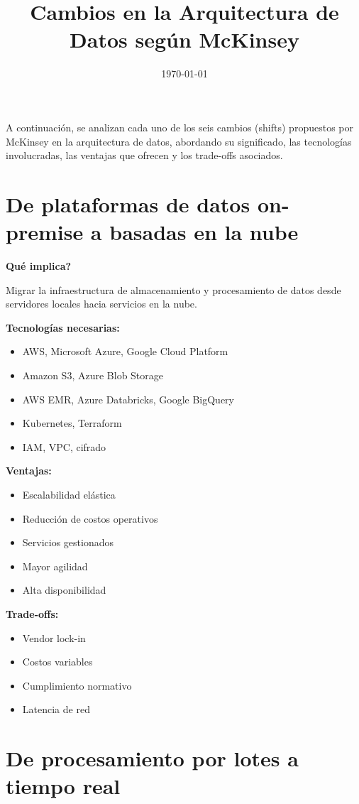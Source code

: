 \documentclass[12pt]{article}
\title{Cambios en la Arquitectura de Datos seg\'un McKinsey}
\date{\today}
\begin{document}
\maketitle

A continuaci\'on, se analizan cada uno de los seis cambios (shifts) propuestos por McKinsey en la arquitectura de datos, abordando su significado, las tecnolog\'ias involucradas, las ventajas que ofrecen y los trade-offs asociados.

\section{De plataformas de datos on-premise a basadas en la nube}

\textbf{\textquestiondown Qu\'e implica?} \par
Migrar la infraestructura de almacenamiento y procesamiento de datos desde servidores locales hacia servicios en la nube.

\textbf{Tecnolog\'ias necesarias:}
\begin{itemize}
\item AWS, Microsoft Azure, Google Cloud Platform
\item Amazon S3, Azure Blob Storage
\item AWS EMR, Azure Databricks, Google BigQuery
\item Kubernetes, Terraform
\item IAM, VPC, cifrado
\end{itemize}

\textbf{Ventajas:}
\begin{itemize}
\item Escalabilidad el\'astica
\item Reducci\'on de costos operativos
\item Servicios gestionados
\item Mayor agilidad
\item Alta disponibilidad
\end{itemize}

\textbf{Trade-offs:}
\begin{itemize}
\item Vendor lock-in
\item Costos variables
\item Cumplimiento normativo
\item Latencia de red
\end{itemize}

\section{De procesamiento por lotes a tiempo real}
\end{document}
